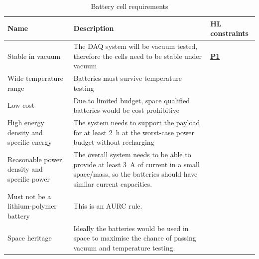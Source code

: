 \documentclass{report}
\newcommand{\hlreq}[1]{\hyperlink{req-#1}{\textbf{#1}}}
\begin{document}
\begin{table}[H]
  \centering
  \begin{tabular}{|p{}|p{}|p{}|}
    \hline
    \textbf{Name}                               & \textbf{Description}                                                                                                                                               & \textbf{HL constraints} \\ \hline
    Stable in vacuum                            & The DAQ system will be vacuum tested, therefore the cells need to be stable under vacuum                                                                           & \hlreq{P1}              \\\hline
    Wide temperature range                      & Batteries must survive temperature testing                                                                                                                         &                         \\\hline
    Low cost                                    & Due to limited budget, space qualified batteries would be cost prohibitive                                                                                         &                         \\\hline
    High energy density and specific energy     & The system needs to support the payload for at least \SI{2}{\hour} at the worst-case power budget without recharging                                               &                         \\\hline
    Reasonable power density and specific power & The overall system needs to be able to provide at least \SI{3}{\ampere} of current in a small space/mass, so the batteries should have similar current capacities. &                         \\\hline
    Must not be a lithium-polymer battery       & This is an AURC rule.                                                                                                                                              &                         \\\hline
    Space heritage                              & Ideally the batteries would be used in space to maximise the chance of passing vacuum and temperature testing.                                                     &                         \\\hline
  \end{tabular}
  \caption{Battery cell requirements}
  \label{tabl:battery-requirements}
\end{table}
\end{document}

